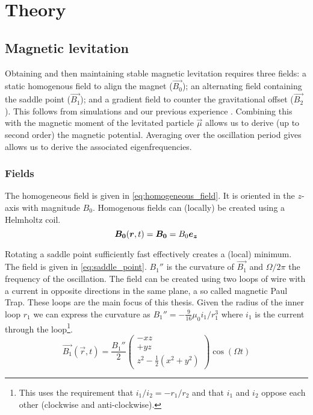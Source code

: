 \chapter{Theory}
\label{chap:theory}

\section{Magnetic levitation}
\label{sec:magnetic_levitation}
Obtaining and then maintaining stable magnetic levitation requires three fields: a static homogenous field to align the magnet ($\vec{B_0}$); an alternating field containing the saddle point ($\vec{B_1}$); and a gradient field to counter the gravitational offset ($\vec{B_2}$). This follows from simulations and our previous experience \cite{perdriat,mart,eli}. Combining this with the magnetic moment of the levitated particle $\vec{\mu}$ allows us to derive (up to second order) the magnetic potential. Averaging over the oscillation period gives allows us to derive the associated eigenfrequencies.

\subsection{Fields}
\label{subsec:fields}
The homogeneous field is given in \autoref{eq:homogeneous_field}. It is oriented in the $z$-axis with magnitude $B_0$. Homogenous fields can (locally) be created using a Helmholtz coil.
\begin{equation}
    \bm{B_0}(\bm{r}, t) = \bm{B_0} = B_0 \bm{e_z}
    \label{eq:homogeneous_field}
\end{equation}

Rotating a saddle point sufficiently fast effectively creates a (local) minimum. The field is given in \autoref{eq:saddle_point}. $B_1''$ is the curvature of $\vec{B_1}$ and $\Omega / 2\pi$ the frequency of the oscillation. The field can be created using two loops of wire with a current in opposite directions in the same plane, a so called magnetic Paul Trap. These loops are the main focus of this thesis. Given the radius of the inner loop $r_1$ we can express the curvature as $B_1'' = -\frac{9}{16}\mu_0i_1/r_1^3$ where $i_1$ is the current through the loop\footnote{This uses the requirement that $i_1/i_2 = -r_1/r_2$ and that $i_1$ and $i_2$ oppose each other (clockwise and anti-clockwise).}.
\begin{equation}
    \vec{B_1}(\vec{r}, t) = \frac{B_1''}{2} \begin{pmatrix}
        -xz \\
        +yz \\
        z^2 - \frac{1}{2}\left(x^2 + y^2\right)
    \end{pmatrix} \cos(\Omega t)
    \label{eq:saddle_point}
\end{equation}

